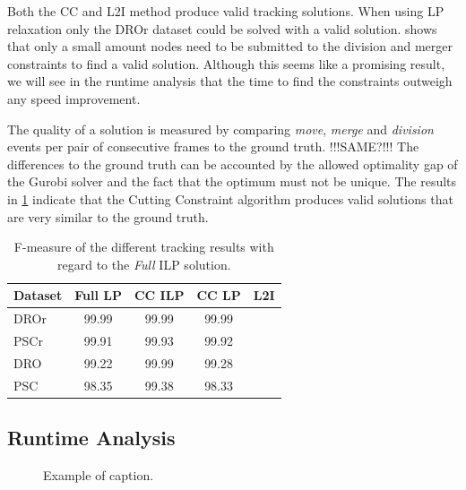 \documentclass[10pt,twocolumn,letterpaper]{article}
\begin{document}
Both the CC and L2I method produce valid tracking solutions. When using LP relaxation only the DROr dataset could be solved with a valid solution.  shows that only a small amount nodes need to be submitted to the division and merger constraints to find a valid solution. Although this seems like a promising result, we will see in the runtime analysis that the time to find the constraints outweigh any speed improvement.

The quality of a solution is measured by comparing \textit{move}, \textit{merge} and \textit{division} events per pair of consecutive frames to the ground truth. !!!SAME?!!! The differences to the ground truth can be accounted by the allowed optimality gap of the Gurobi solver and the fact that the optimum must not be unique. The results in \cref{tab:fmeasure} indicate that the Cutting Constraint algorithm produces valid solutions that are very similar to the ground truth.

\begin{table}
  \begin{center}
  \begin{tabular}{|l||c|c|c|c|}
    \hline
    Dataset & Full LP & CC ILP & CC LP & L2I\\
    \hline\hline
    DROr & 99.99 & 99.99 & 99.99 & \\
    PSCr & 99.91 & 99.93 & 99.92 &\\
    DRO & 99.22 & 99.99 & 99.28 & \\
    PSC & 98.35 & 99.38 & 98.33 & \\
    \hline
  \end{tabular}
  \end{center}
  \caption{F-measure of the different tracking results with regard to the \textit{Full} ILP solution.}
  \label{tab:fmeasure}
\end{table}


\subsection{Runtime Analysis}

\begin{figure}[t]
  \begin{center}
  \fbox{\rule{0pt}{2in} \rule{0.9\linewidth}{0pt}}
  \end{center}
   \caption{Example of caption.}
  \label{fig:runtime}
\end{figure}
\end{document}
